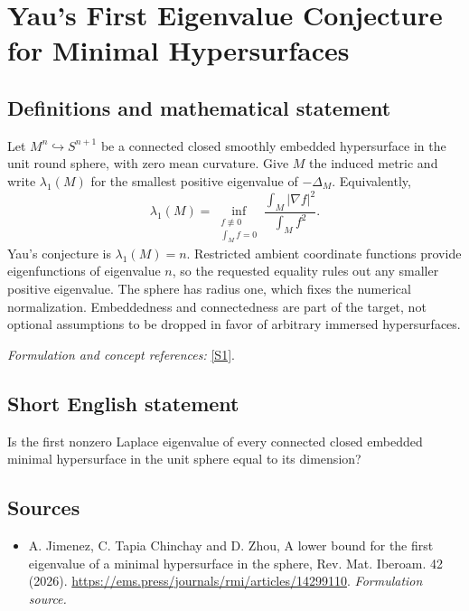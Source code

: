\documentclass[11pt]{article}
\begin{document}
\section*{\texorpdfstring{Yau's First Eigenvalue Conjecture for Minimal Hypersurfaces}{Yau's First Eigenvalue Conjecture for Minimal Hypersurfaces}}\label{407}
\subsection{Definitions and mathematical statement}
Let $M^n\hookrightarrow S^{n+1}$ be a connected closed smoothly embedded hypersurface in the unit round sphere, with zero mean curvature. Give $M$ the induced metric and write $\lambda_1(M)$ for the smallest positive eigenvalue of $-\Delta_M$. Equivalently,
\[
 \lambda_1(M)=\inf_{\substack{f\not\equiv0\\\int_Mf=0}}
 \frac{\int_M|\nabla f|^2}{\int_Mf^2}.
\]
Yau's conjecture is $\lambda_1(M)=n$. Restricted ambient coordinate functions provide eigenfunctions of eigenvalue $n$, so the requested equality rules out any smaller positive eigenvalue. The sphere has radius one, which fixes the numerical normalization. Embeddedness and connectedness are part of the target, not optional assumptions to be dropped in favor of arbitrary immersed hypersurfaces.
\par\smallskip\textit{Formulation and concept references:} \href{https://ems.press/journals/rmi/articles/14299110}{[S1]}.

\subsection{Short English statement}
Is the first nonzero Laplace eigenvalue of every connected closed embedded minimal hypersurface in the unit sphere equal to its dimension?
\subsection{Sources}
\begin{itemize}
\item[S1]A. Jimenez, C. Tapia Chinchay and D. Zhou, A lower bound for the first eigenvalue of a minimal hypersurface in the sphere, Rev. Mat. Iberoam. 42 (2026).
\url{https://ems.press/journals/rmi/articles/14299110}.
\textit{Formulation source.}
\end{itemize}
\end{document}
